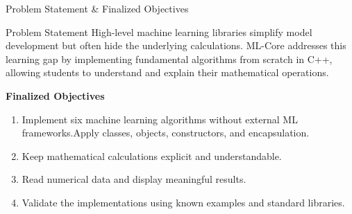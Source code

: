 \documentclass[aspectratio=169,11pt]{beamer}
\begin{document}
\begin{frame}{Problem Statement \& Finalized Objectives}
\begin{block}{Problem Statement}
\footnotesize
High-level machine learning libraries simplify model development but often hide the underlying calculations. ML-Core addresses this learning gap by implementing fundamental algorithms from scratch in C++, allowing students to understand and explain their mathematical operations.
\end{block}

\vspace{2mm}

\textbf{\color{GEUBlue}Finalized Objectives}
\begin{enumerate}\itemsep2pt
\footnotesize
\item Implement six machine learning algorithms without external ML frameworks.Apply classes, objects, constructors, and encapsulation.
\item Keep mathematical calculations explicit and understandable.
\item Read numerical data and display meaningful results.
\item Validate the implementations using known examples and standard libraries.
\end{enumerate}
\end{frame}
\end{document}
